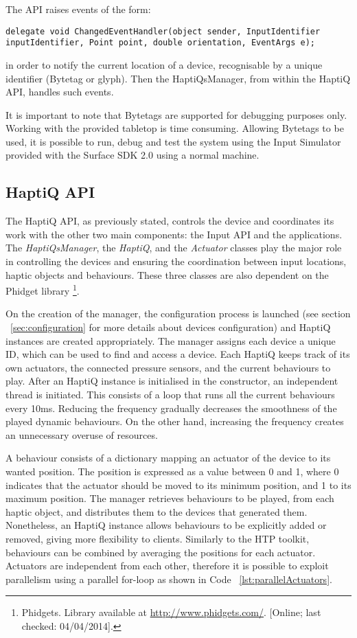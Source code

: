 The API raises events of the form:
\lstset{style=sharpc1}
\begin{lstlisting}
delegate void ChangedEventHandler(object sender, InputIdentifier inputIdentifier, Point point, double orientation, EventArgs e);
\end{lstlisting}

in order to notify the current location of a device, recognisable by a unique identifier (Bytetag or glyph). Then the HaptiQsManager, from within the HaptiQ API, handles such events.  

It is important to note that Bytetags are supported for debugging purposes only. Working with the provided tabletop is time consuming. Allowing Bytetags to be used, it is possible to run, debug and test the system using the Input Simulator provided with the Surface SDK 2.0 using a normal machine. 

\subsection{HaptiQ API}

The HaptiQ API, as previously stated, controls the device and coordinates its work with the other two main components: the Input API and the applications. The \textit{HaptiQsManager}, the \textit{HaptiQ}, and the \textit{Actuator} classes play the major role in controlling the devices and ensuring the coordination between input locations, haptic objects and behaviours. These three classes are also dependent on the Phidget library \footnote{Phidgets. Library available at \url{http://www.phidgets.com/}. [Online; last checked: 04/04/2014].}. 

On the creation of the manager, the configuration process is launched (see section ~\ref{sec:configuration} for more details about devices configuration) and HaptiQ instances are created appropriately. The manager assigns each device a unique ID, which can be used to find and access a device. 
Each HaptiQ keeps track of its own actuators, the connected pressure sensors, and the current behaviours to play. After an HaptiQ instance is initialised in the constructor, an independent thread is initiated. This consists of a loop that runs all the current behaviours every 10ms. Reducing the frequency gradually decreases the smoothness of the played dynamic behaviours. On the other hand, increasing the frequency creates an unnecessary overuse of resources. 

A behaviour consists of a dictionary mapping an actuator of the device to its wanted position. The position is expressed as a value between 0 and 1, where 0 indicates that the actuator should be moved to its minimum position, and 1 to its maximum position. The manager retrieves behaviours to be played, from each haptic object, and distributes them to the devices that generated them. Nonetheless, an HaptiQ instance allows behaviours to be explicitly added or removed, giving more flexibility to clients. Similarly to the HTP toolkit, behaviours can be combined by averaging the positions for each actuator. 
Actuators are independent from each other, therefore it is possible to exploit parallelism using a parallel for-loop as shown in Code ~\ref{lst:parallelActuators}.

